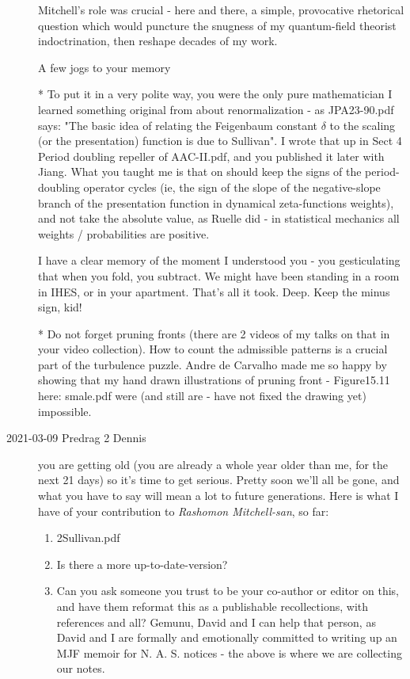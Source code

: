 \begin{description}
Mitchell's role was crucial - here and there, a simple, provocative
rhetorical question which would puncture the snugness of my quantum-field
theorist indoctrination, then reshape decades of my work.

A few jogs to your memory

* To put it in a very polite way, you were the only pure mathematician I
learned something original from about renormalization - as
 {JPA23-90.pdf}
says: "The basic idea of relating the Feigenbaum constant $\delta$ to the
scaling (or the presentation) function is due to Sullivan". I wrote that
up in Sect 4 Period doubling repeller of
 {AAC-II.pdf}, and
you published it later with Jiang. What you taught me is that on should
keep the signs of the period-doubling operator cycles (ie, the sign of
the slope of the negative-slope branch of the presentation function in
dynamical zeta-functions weights), and not take the absolute value, as
Ruelle did - in statistical mechanics all weights / probabilities are
positive.

I have a clear memory of the moment I understood you - you gesticulating
that when you fold, you subtract. We might have been standing in a room
in IHES, or in your apartment. That's all it took. Deep. Keep the minus
sign, kid!

* Do not forget pruning fronts (there are 2 videos of my talks on that in
your video collection). How to count the admissible patterns is a crucial
part of the turbulence puzzle. Andre de Carvalho made me so happy by
showing that my hand drawn illustrations of pruning front -  Figure15.11
here:  {smale.pdf} were
(and still are - have not fixed the drawing yet) impossible.

\item[2021-03-09 Predrag 2 Dennis]
you are getting old (you are already a whole year older than me, for the
next 21 days) so it's time to get serious. Pretty soon we'll all be gone,
and what you have to say will mean a lot to future generations. Here is
what I have of your contribution to \emph{Rashomon Mitchell-san}, so far:

\begin{enumerate}
  \item {}
        {2Sullivan.pdf}
  \item Is there a more up-to-date-version?
  \item Can you ask someone you trust to be your co-author or editor
        on this, and have them reformat this as a publishable
        recollections, with references and all? Gemunu, David and I can
        help that person, as David and I are formally and emotionally
        committed to writing up an MJF memoir for N. A. S. notices - the
        above is where we are collecting our notes.
\end{enumerate}


\end{description}
